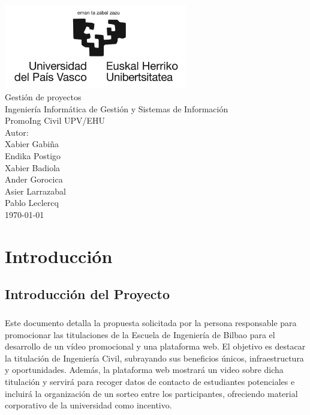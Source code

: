 \documentclass{report}
\begin{document}
    \begin{titlepage}
        \centering
        \includegraphics[width=0.6\textwidth]{./img/logo.jpg}\\
        \vspace{1cm}
        \LARGE Gestión de proyectos\\
        \vspace{0.5cm}
        \Large Ingeniería Informática de Gestión y Sistemas de Información\\
        \vspace{3cm}
        \Huge PromoIng Civil UPV/EHU\\
        \vspace{2.5cm}
        \Large Autor:\\
        \vspace{0.2cm}
        \large Xabier Gabiña\\
        \large Endika Postigo\\
        \large Xabier Badiola\\
        \large Ander Gorocica\\
        \large Asier Larrazabal\\
        \large Pablo Leclercq\\
        \vfill
        \today
    \end{titlepage}
    \tableofcontents
    \listoffigures
    \listoftables
    \chapter{Introducción}
        \section{Introducción del Proyecto}
            \paragraph*{}
            Este documento detalla la propuesta solicitada por la persona responsable para promocionar las titulaciones de la Escuela de Ingeniería de Bilbao para el desarrollo de un vídeo promocional y una plataforma web. El objetivo es destacar la titulación de Ingeniería Civil, subrayando sus beneficios únicos, infraestructura y oportunidades. Además, la plataforma web mostrará un video sobre dicha titulación y servirá para recoger datos de contacto de estudiantes potenciales e incluirá la organización de un sorteo entre los participantes, ofreciendo material corporativo de la universidad como incentivo.
\end{document}
